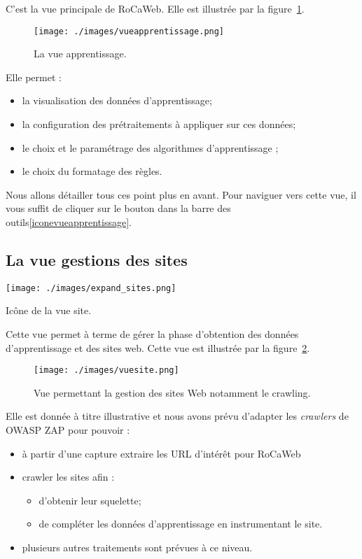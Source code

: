 \documentclass[a4paper,10pt,justified]{book}
\begin{document}
C'est la vue principale de RoCaWeb. Elle est illustrée par la figure~\ref{vueapprentissage}. 
\begin{figure}
 \texttt{[image: ./images/vueapprentissage.png]}
 \label{vueapprentissage}
 \caption{La vue apprentissage.}
\end{figure}

Elle permet  : 
\begin{itemize}
 \item la visualisation des données d'apprentissage;
 \item la configuration des prétraitements à appliquer sur ces données;
 \item  le choix et le paramétrage des algorithmes d'apprentissage ;
 \item  le choix du formatage des règles. 
\end{itemize}
Nous allons détailler tous ces point plus en avant. 
Pour naviguer vers cette vue,  il vous suffit de cliquer sur le bouton dans la barre des outils\ref{iconevueapprentissage}.




\subsection{La vue gestions des sites}
\begin{marginfigure}
 \texttt{[image: ./images/expand\_sites.png]}
 \label{iconevuesites}
\caption{Icône de la vue site.}
 \end{marginfigure}
 
Cette vue permet à terme de gérer la phase d'obtention des données d'apprentissage et des sites web. 
Cette vue est illustrée par la figure~\ref{vuesite}.
\begin{figure}
 \texttt{[image: ./images/vuesite.png]}
 \label{vuesite}
 \caption{Vue permettant la gestion des sites Web notamment le crawling.}
\end{figure}



Elle est donnée à titre illustrative et nous avons prévu
d'adapter les \textit{crawlers} de OWASP ZAP pour pouvoir : 
\begin{itemize}
 \item à partir d'une capture extraire les URL d'intérêt pour RoCaWeb
 \item crawler les sites afin : 
 \begin{itemize}
  \item d'obtenir leur squelette;
  \item de compléter les données d'apprentissage en instrumentant le site.  
 \end{itemize}
 \item plusieurs autres traitements sont prévues à ce niveau. 
\end{itemize}
\end{document}
